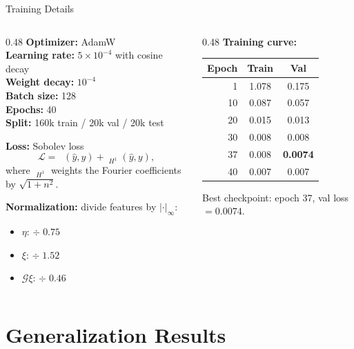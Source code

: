 \documentclass[aspectratio=169,11pt]{beamer}
\newcommand{\Gop}{\mathcal{G}}
\DeclareMathOperator{\relltwo}{rel\text{-}L^2}
\begin{document}
\begin{frame}{Training Details}

\begin{columns}[T]
\begin{column}{0.48\textwidth}
\textbf{Optimizer:} AdamW\\
\textbf{Learning rate:} $5 \times 10^{-4}$ with cosine decay\\
\textbf{Weight decay:} $10^{-4}$\\
\textbf{Batch size:} 128\\
\textbf{Epochs:} 40\\
\textbf{Split:} 160k train / 20k val / 20k test


\textbf{Loss:} Sobolev loss
\[
  \mathcal{L} = \relltwo(\hat y, y) + \relltwo_{\!H^1}(\hat y, y),
\]
where $\relltwo_{H^1}$ weights the Fourier coefficients by $\sqrt{1 + n^2}$.


\textbf{Normalization:} divide features by $|\cdot|_\infty$:
\begin{itemize}
  \item $\eta$: $\div\; 0.75$
  \item $\xi$: $\div\; 1.52$
  \item $\Gop\xi$: $\div\; 0.46$
\end{itemize}
\end{column}

\begin{column}{0.48\textwidth}
\textbf{Training curve:}


\begin{tabular}{rcc}
\toprule
Epoch & Train & Val \\
\midrule
1  & 1.078  & 0.175 \\
10 & 0.087  & 0.057 \\
20 & 0.015  & 0.013 \\
30 & 0.008  & 0.008 \\
37 & 0.008  & \textbf{0.0074} \\
40 & 0.007  & 0.007 \\
\bottomrule
\end{tabular}


Best checkpoint: epoch 37, val loss $= 0.0074$.

\end{column}
\end{columns}
\end{frame}

\section{Generalization Results}
\end{document}
